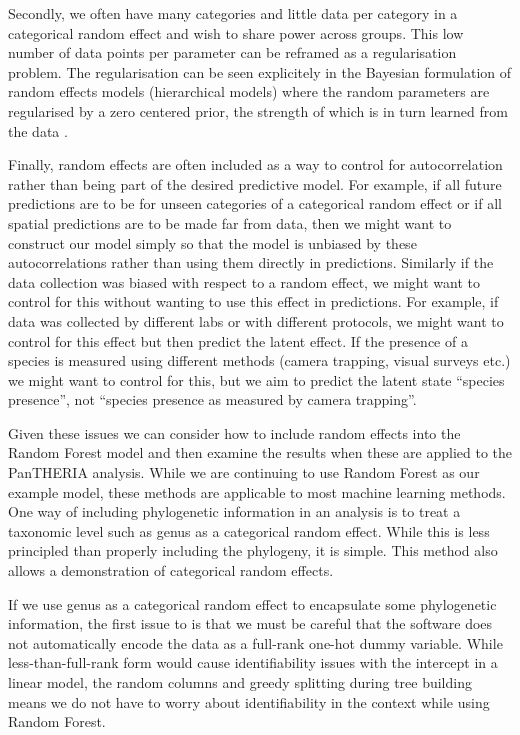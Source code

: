 \documentclass[10pt,]{article}
\begin{document}
Secondly, we often have many categories and little data per category in a categorical random effect and wish to share power across groups.
This low number of data points per parameter can be reframed as a regularisation problem.
The regularisation can be seen explicitely in the Bayesian formulation of random effects models (hierarchical models) where the random parameters are regularised by a zero centered prior, the strength of which is in turn learned from the data \citep{simpson2017penalising}.

Finally, random effects are often included as a way to control for autocorrelation rather than being part of the desired predictive model.
For example, if all future predictions are to be for unseen categories of a categorical random effect or if all spatial predictions are to be made far from data, then we might want to construct our model simply so that the model is unbiased by these autocorrelations rather than using them directly in predictions.
Similarly if the data collection was biased with respect to a random effect, we might want to control for this without wanting to use this effect in predictions.
For example, if data was collected by different labs or with different protocols, we might want to control for this effect but then predict the latent effect.
If the presence of a species is measured using different methods (camera trapping, visual surveys etc.) we might want to control for this, but we aim to predict the latent state ``species presence'', not ``species presence as measured by camera trapping''.

Given these issues we can consider how to include random effects into the Random Forest model and then examine the results when these are applied to the PanTHERIA analysis.
While we are continuing to use Random Forest as our example model, these methods are applicable to most machine learning methods.
One way of including phylogenetic information in an analysis is to treat a taxonomic level such as genus as a categorical random effect.
While this is less principled than properly including the phylogeny, it is simple.
This method also allows a demonstration of categorical random effects.

If we use genus as a categorical random effect to encapsulate some phylogenetic information, the first issue to is that we must be careful that the software does not automatically encode the data as a full-rank one-hot dummy variable.
While less-than-full-rank form would cause identifiability issues with the intercept in a linear model, the random columns and greedy splitting during tree building means we do not have to worry about identifiability in the context while using Random Forest.
\end{document}
